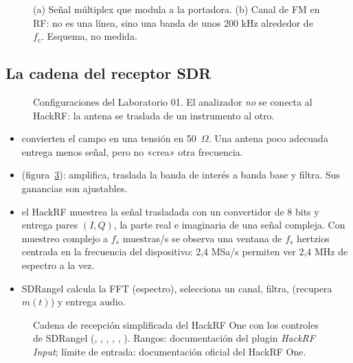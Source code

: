 \begin{figure}[H]
\centering
\resizebox{\linewidth}{!}{}
\caption{(a) Señal múltiplex que modula a la portadora. (b) Canal de FM en RF: no es una línea, sino una banda de unos 200 kHz alrededor de $f_c$. Esquema, no medida.}
\label{fig:fm}
\end{figure}

\subsection{La cadena del receptor SDR}

\begin{figure}[H]
\centering
\resizebox{\linewidth}{!}{}
\caption{Configuraciones del Laboratorio 01. El analizador \emph{no} se conecta al HackRF: la antena se traslada de un instrumento al otro.}
\label{fig:cadenafm}
\end{figure}

\begin{itemize}
  \item {} convierten el campo en una tensión en 50~$\Omega$. Una antena poco adecuada entrega menos señal, pero no «crea» otra frecuencia.
  \item {} (figura~\ref{fig:frontend}): amplifica, traslada la banda de interés a banda base y filtra. Sus ganancias son ajustables.
  \item {} el HackRF muestrea la señal trasladada con un convertidor de 8 bits y entrega pares $(I, Q)$, la parte real e imaginaria de una señal compleja. Con muestreo complejo a $f_s$ muestras/s se observa una ventana de $f_s$ hertzios centrada en la frecuencia del dispositivo: 2,4 MSa/s permiten ver 2,4 MHz de espectro a la vez.
  \item {} SDRangel calcula la FFT (espectro), selecciona un canal, filtra,  (recupera $m(t)$) y entrega audio.
\end{itemize}

\begin{figure}[H]
\centering
\resizebox{\linewidth}{!}{}
\caption{Cadena de recepción simplificada del HackRF One con los controles de SDRangel (, , , , , ). Rangos: documentación del plugin \emph{HackRF Input}; límite de entrada: documentación oficial del HackRF One.}
\label{fig:frontend}
\end{figure}


